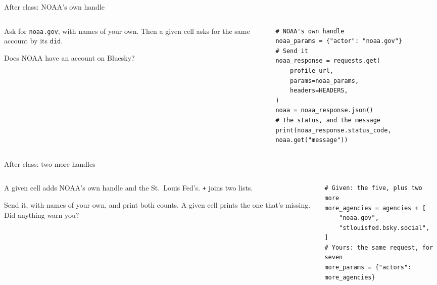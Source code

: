 \documentclass[9pt,aspectratio=169]{beamer}
\begin{document}
\begin{frame}[fragile]{After class: NOAA's own handle}
    \begin{columns}[T]
        \begin{column}{0.37\textwidth}
            Ask for \texttt{noaa.gov}, with names of your own. Then a given cell asks for the same account by its \texttt{did}.

            \medskip
            Does NOAA have an account on Bluesky?
        \end{column}
        \begin{column}{0.6\textwidth}
\begin{lstlisting}
# NOAA's own handle
noaa_params = {"actor": "noaa.gov"}
# Send it
noaa_response = requests.get(
    profile_url,
    params=noaa_params,
    headers=HEADERS,
)
noaa = noaa_response.json()
# The status, and the message
print(noaa_response.status_code, noaa.get("message"))
\end{lstlisting}
        \end{column}
    \end{columns}
\end{frame}

\begin{frame}[fragile]{After class: two more handles}
    \begin{columns}[T]
        \begin{column}{0.37\textwidth}
            A given cell adds NOAA's own handle and the St.\ Louis Fed's. \texttt{+} joins two lists.

            \medskip
            Send it, with names of your own, and print both counts. A given cell prints the one that's missing. Did anything warn you?
        \end{column}
        \begin{column}{0.6\textwidth}
\begin{lstlisting}
# Given: the five, plus two more
more_agencies = agencies + [
    "noaa.gov",
    "stlouisfed.bsky.social",
]
# Yours: the same request, for seven
more_params = {"actors": more_agencies}
\end{lstlisting}
        \end{column}
    \end{columns}
\end{frame}

\end{document}
